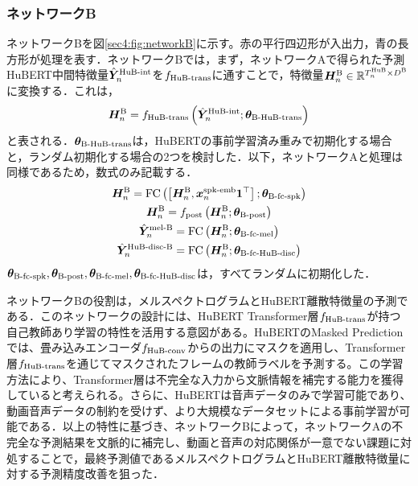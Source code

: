 \subsubsection{ネットワークB}
ネットワークBを図\ref{sec4:fig:networkB}に示す。赤の平行四辺形が入出力，青の長方形が処理を表す．ネットワークBでは，まず，ネットワークAで得られた予測HuBERT中間特徴量$\hat{\bm{Y}}^{\text{HuB-int}}_{n}$を$f_{\text{HuB-trans}}$に通すことで，特徴量$\bm{H}^{\text{B}}_{n} \in \mathbb{R}^{T^{\text{HuB}}_{n} \times D^{\text{B}}}$に変換する．これは，
\begin{equation}
    \bm{H}^{\text{B}}_{n} = f_{\text{HuB-trans}}\left(\hat{\bm{Y}}^{\text{HuB-int}}_{n}; \bm{\theta}_{\text{B-HuB-trans}}\right)
\end{equation}
と表される．$\bm{\theta}_{\text{B-HuB-trans}}$は，HuBERTの事前学習済み重みで初期化する場合と，ランダム初期化する場合の2つを検討した．以下，ネットワークAと処理は同様であるため，数式のみ記載する．
\begin{gather}
    \bm{H}^{\text{B}}_{n} = \text{FC}\left(\left[\bm{H}^{\text{B}}_{n}, \bm{x}^{\text{spk-emb}}_{n} \bm{1}^{\top}\right]; \bm{\theta}_{\text{B-fc-spk}}\right) \\
    \bm{H}^{\text{B}}_{n} = f_{\text{post}}\left(\bm{H}^{\text{B}}_{n}; \bm{\theta}_{\text{B-post}}\right) \\
    \hat{\bm{Y}}^{\text{mel-B}}_{n} = \text{FC}\left(\bm{H}^{\text{B}}_{n}; \bm{\theta}_{\text{B-fc-mel}}\right) \\
    \hat{\bm{Y}}^{\text{HuB-disc-B}}_{n} = \text{FC}\left(\bm{H}^{\text{B}}_{n}; \bm{\theta}_{\text{B-fc-HuB-disc}}\right)
\end{gather}
$\bm{\theta}_{\text{B-fc-spk}}, \bm{\theta}_{\text{B-post}}, \bm{\theta}_{\text{B-fc-mel}}, \bm{\theta}_{\text{B-fc-HuB-disc}}$は，すべてランダムに初期化した．

ネットワークBの役割は，メルスペクトログラムとHuBERT離散特徴量の予測である．このネットワークの設計には、HuBERT Transformer層$f_{\text{HuB-trans}}$が持つ自己教師あり学習の特性を活用する意図がある。HuBERTのMasked Predictionでは、畳み込みエンコーダ$f_{\text{HuB-conv}}$からの出力にマスクを適用し、Transformer層$f_{\text{HuB-trans}}$を通じてマスクされたフレームの教師ラベルを予測する。この学習方法により、Transformer層は不完全な入力から文脈情報を補完する能力を獲得していると考えられる。さらに、HuBERTは音声データのみで学習可能であり、動画音声データの制約を受けず、より大規模なデータセットによる事前学習が可能である．以上の特性に基づき、ネットワークBによって，ネットワークAの不完全な予測結果を文脈的に補完し、動画と音声の対応関係が一意でない課題に対処することで，最終予測値であるメルスペクトログラムとHuBERT離散特徴量に対する予測精度改善を狙った．

